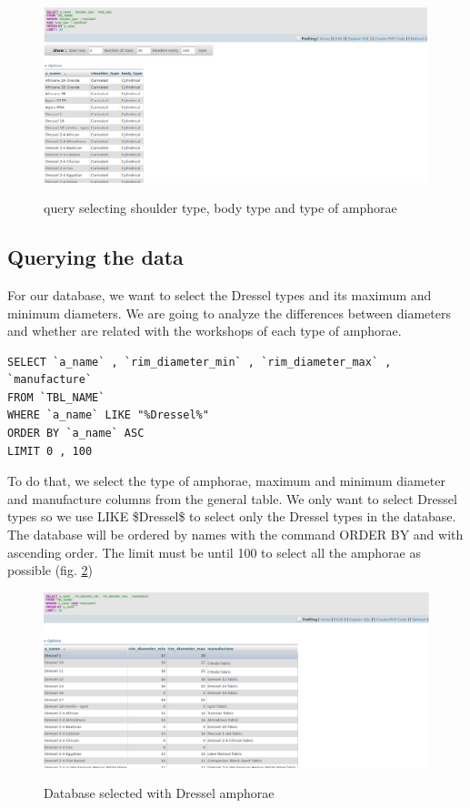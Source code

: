 \documentclass[10pt,a4paper]{article}
\begin{document}
\begin{figure}[hdp]
\centering
\includegraphics[scale=0.30]{query4.png}
\label{query4}
\caption{query selecting shoulder type, body type and type of amphorae}
\end{figure} 


\subsection{Querying the data}

For our database, we want to select the Dressel types and its maximum and minimum diameters. We are going to analyze the differences between diameters and whether are related with the workshops of each type of amphorae. 

\begin{verbatim}
SELECT `a_name` , `rim_diameter_min` , `rim_diameter_max` , `manufacture`
FROM `TBL_NAME`
WHERE `a_name` LIKE "%Dressel%"
ORDER BY `a_name` ASC
LIMIT 0 , 100
\end{verbatim}

To do that, we select the type of amphorae, maximum and minimum diameter and manufacture columns from the general table. We only want to select Dressel types so we use LIKE \$Dressel\$ to select only the Dressel types in the database. The database will be ordered by names with the command ORDER BY and with ascending order. The limit must be until 100 to select all the amphorae as possible (fig. \ref{query5})

\begin{figure}[hdp]
\centering
\includegraphics[scale=0.30]{query5.png}
\label{query5}
\caption{Database selected with Dressel amphorae}
\end{figure} 
\end{document}
